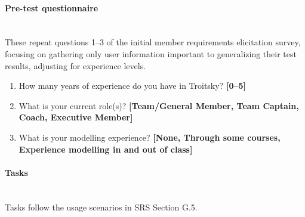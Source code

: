\documentclass[12pt, titlepage]{article}
\begin{document}
\paragraph{Pre-test questionnaire}\mbox{}\\
These repeat questions 1--3 of the initial member requirements elicitation
survey, focusing on gathering only user information important to generalizing 
their test results, adjusting for experience levels.
\begin{enumerate}
  \item How many years of experience do you have in Troitsky? \textbf{[0--5]}
  \item What is your current role(s)? \textbf{[Team/General Member, Team Captain,
    Coach, Executive Member]}
  \item What is your modelling experience? \textbf{[None, Through some courses,
    Experience modelling in and out of class]}
\end{enumerate}

\paragraph{Tasks}\mbox{}\\
Tasks follow the usage scenarios in SRS Section G.5.
\end{document}
